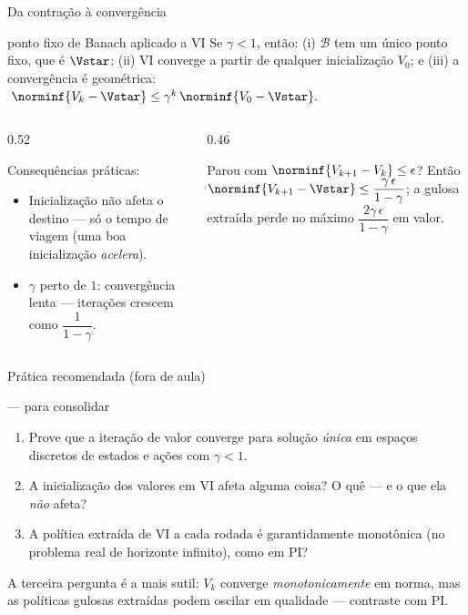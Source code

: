 \documentclass[aspectratio=169, 11pt]{beamer}
\newcommand{\Bop}{\mathcal{B}}                 %
\begin{document}
\begin{frame}{Da contração à convergência}
  \begin{teobox}{ponto fixo de Banach aplicado a VI}
    Se $\gamma<1$, então: (i) $\Bop$ tem um \alert{único} ponto fixo, que é $\Vstar$;
    (ii) VI converge a partir de \alert{qualquer} inicialização $V_0$; e (iii) a
    convergência é geométrica:
    \(\; \norminf{V_k - \Vstar} \le \gamma^k\, \norminf{V_0 - \Vstar}. \)
  \end{teobox}
  \begin{columns}[T]
    \begin{column}{0.52\textwidth}
      {\small Consequências práticas:
      \begin{itemize}\setlength{\itemsep}{0.3ex}
        \item Inicialização não afeta o destino --- só o tempo de viagem (uma boa
              inicialização \emph{acelera}).
        \item $\gamma$ perto de $1$: convergência lenta --- iterações crescem como
              $\dfrac{1}{1-\gamma}$.
      \end{itemize}}
    \end{column}
    \begin{column}{0.46\textwidth}
      \begin{ideiabox}
        Parou com $\norminf{V_{k+1}-V_k} \le \epsilon$? Então
        $\norminf{V_{k+1} - \Vstar} \le \dfrac{\gamma\,\epsilon}{1-\gamma}$; a gulosa
        extraída perde no máximo $\dfrac{2\gamma\,\epsilon}{1-\gamma}$ em valor.
      \end{ideiabox}
    \end{column}
  \end{columns}
\end{frame}

\begin{frame}{Prática recomendada (fora de aula)}
  \begin{exbox}{--- para consolidar}
    \begin{enumerate}\setlength{\itemsep}{0.5ex}
      \item Prove que a iteração de valor converge para solução \emph{única} em
            espaços discretos de estados e ações com $\gamma < 1$.
      \item A inicialização dos valores em VI afeta alguma coisa? O quê --- e o que ela
            \emph{não} afeta?
      \item A política extraída de VI a cada rodada é garantidamente
            \alert{monotônica} (no problema real de horizonte infinito), como em PI?
    \end{enumerate}
  \end{exbox}
  \begin{ideiabox}
    A terceira pergunta é a mais sutil: $V_k$ converge \emph{monotonicamente} em norma,
    mas as políticas gulosas extraídas podem oscilar em qualidade --- contraste com PI.
  \end{ideiabox}
\end{frame}
\end{document}
